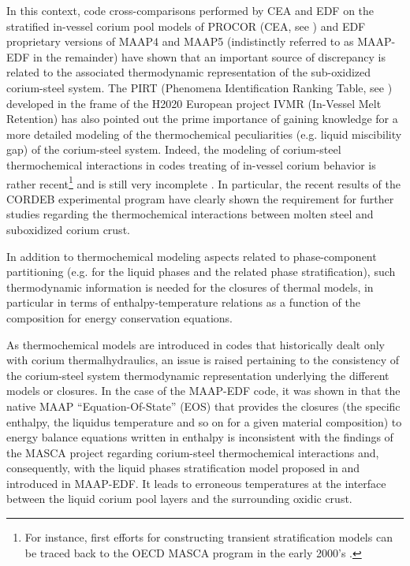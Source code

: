 \documentclass[11pt]{article}\usepackage{geometry} \geometry{letterpaper, margin=25.4mm}
\begin{document}
In this context, code cross-comparisons \cite{Bakouta2015} performed by CEA and EDF on the stratified in-vessel corium pool models of PROCOR (CEA, see \cite{LeTellier2015}) and EDF proprietary versions of MAAP4 \cite{maap4} and MAAP5 \cite{maap5} (indistinctly referred to as MAAP-EDF in the remainder) have shown that an important source of discrepancy is related to the associated thermodynamic representation of the sub-oxidized corium-steel system. The PIRT (Phenomena Identification Ranking Table, see \cite{Carenini2019a}) developed in the frame of the H2020 European project IVMR (In-Vessel Melt Retention) has also pointed out the prime importance of gaining knowledge for a more detailed modeling of the thermochemical peculiarities (e.g. liquid miscibility gap) of the corium-steel system. Indeed, the modeling of corium-steel thermochemical interactions in codes treating of in-vessel corium behavior is rather recent\footnote{For instance, first efforts for constructing transient stratification models can be traced back to the OECD MASCA program in the early 2000's \cite{Tsurikov2007}.} and is still very incomplete \cite{Carenini2018}. In particular, the recent results of the CORDEB experimental program \cite{Almjashev2018} have clearly shown the requirement for further studies regarding the thermochemical interactions between molten steel and suboxidized corium crust. 

In addition to thermochemical modeling aspects related to phase-component partitioning (e.g. for the liquid phases and the related phase stratification), such thermodynamic information is needed for the closures of thermal models, in particular in terms of enthalpy-temperature relations as a function of the composition for energy conservation equations.

As thermochemical models are introduced in codes that historically dealt only with corium thermalhydraulics, an issue is raised pertaining to the consistency of the corium-steel system thermodynamic representation underlying the different models or closures. In the case of the MAAP-EDF code, it was shown in \cite{Bakouta2015} that the native MAAP ``Equation-Of-State'' (EOS) that provides the closures (the specific enthalpy, the liquidus temperature and so on for a given material composition) to energy balance equations written in enthalpy is inconsistent with the findings of the MASCA project regarding corium-steel thermochemical interactions and, consequently, with the liquid phases stratification model proposed in \cite{LeTellier2014} and introduced in MAAP-EDF. It leads to erroneous temperatures at the interface between the liquid corium pool layers and the surrounding oxidic crust. 
\end{document}
